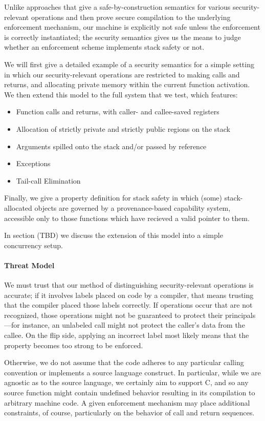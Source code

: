 \documentclass[10pt,conference]{ieeetran}%
\theoremstyle{definition}
\begin{document}
Unlike approaches that give a safe-by-construction semantics
for various security-relevant operations and then prove secure compilation to the underlying
enforcement mechanism, our machine is explicitly not safe unless the enforcement
is correctly instantiated; the security semantics gives us the means to judge whether
an enforcement scheme implements stack safety or not. 

We will first give a detailed example of a security semantics for a simple setting
in which our security-relevant operations are restricted to making calls and returns, and allocating
private memory within the current function activation. We then extend this model
to the full system that we test, which features:
\begin{itemize}
\item Function calls and returns, with caller- and callee-saved registers
\item Allocation of strictly private and strictly public regions on the stack
\item Arguments spilled onto the stack and/or passed by reference
\item Exceptions
\item Tail-call Elimination
\end{itemize}

Finally, we give a property definition for stack safety in which (some) stack-allocated
objects are governed by a provenance-based capability system, accessible only to those
functions which have recieved a valid pointer to them.

In section (TBD) we discuss the extension of this model into a simple concurrency setup.

\paragraph*{Threat Model}

We must trust that our method of distinguishing security-relevant operations is accurate; if it
involves labels placed on code by a compiler, that means trusting that the compiler placed
those labels correctly. If operations occur that are not recognized, those operations
might not be guaranteed to protect their principals---for instance, an unlabeled call
might not protect the caller's data from the callee. On the flip side, applying an incorrect
label most likely means that the property becomes too strong to be enforced.

Otherwise, we do not assume that the code adheres to any particular
calling convention or implements a source language construct.
In particular, while we are agnostic as to the source
language, we certainly aim to support C, and so any source function might contain undefined
behavior resulting in its compilation to arbitrary machine code. A given enforcement
mechanism may place additional constraints, of course, particularly on the behavior of
call and return sequences.
\end{document}
